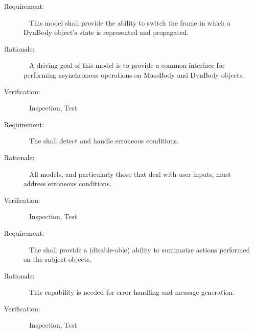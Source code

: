\label{reqt:overview:frame_switch}
\begin{description}
\item[Requirement:]\ \newline
  This model shall provide the ability to switch the
  frame in which a DynBody object's state is represented
  and propagated.

\item[Rationale:]\ \newline
  A driving goal of this model is to provide a common interface
  for performing asynchronous operations on
  MassBody and DynBody objects.

\item[Verification:]\ \newline
  Inspection, Test
\end{description}

\label{reqt:overview:errors}
\begin{description}
\item[Requirement:]\ \newline
  The \ModelDesc shall detect and handle erroneous conditions.

\item[Rationale:]\ \newline
  All models, and particularly those that deal with user inputs,
  must address erroneous conditions.

\item[Verification:]\ \newline
  Inspection, Test
\end{description}

\label{reqt:overview:debug}
\begin{description}
\item[Requirement:]\ \newline
  The \ModelDesc shall provide a (disable-able) ability to
  summarize actions performed on the subject objects.

\item[Rationale:]\ \newline
  This capability is needed for error handling and message generation.

\item[Verification:]\ \newline
  Inspection, Test
\end{description}
